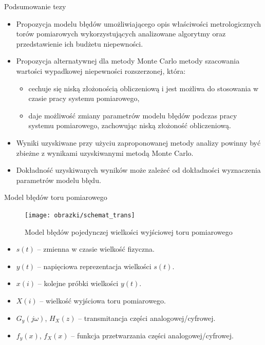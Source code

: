 \documentclass[12pt, polish, aspectratio = 169]{slides}
\begin{document}
\begin{frame}{Podsumowanie tezy}
\begin{itemize}
\item Propozycja modelu błędów umożliwiającego opis właściwości metrologicznych torów pomiarowych wykorzystujących analizowane algorytmy oraz przedstawienie ich budżetu niepewności.
\item Propozycja alternatywnej dla metody Monte Carlo metody szacowania wartości wypadkowej niepewności rozszerzonej, która:
	\begin{itemize}
	\item cechuje się niską złożonością obliczeniową i jest możliwa do stosowania w czasie pracy systemu pomiarowego,
	\item daje możliwość zmiany parametrów modelu błędów podczas pracy systemu pomiarowego, zachowując niską złożoność obliczeniową.
	\end{itemize}
\item Wyniki uzyskiwane przy użyciu zaproponowanej metody analizy powinny być zbieżne z wynikami uzyskiwanymi metodą Monte Carlo.
\item Dokładność uzyskiwanych wyników może zależeć od dokładności wyznaczenia parametrów modelu błędu.
\end{itemize}
\end{frame}


\begin{frame}{Model błędów toru pomiarowego}
\begin{figure}
\texttt{[image: obrazki/schemat\_trans]}
\caption{Model błędów pojedynczej wielkości wyjściowej toru pomiarowego}
\end{figure}
\begin{itemize}
\item $s(t)$ -- zmienna w czasie wielkość fizyczna.
\item $y(t)$ -- napięciowa reprezentacja wielkości $s(t)$.
\item $x(i)$ -- kolejne próbki wielkości $y(t)$.
\item $X(i)$ -- wielkość wyjściowa toru pomiarowego.
\item $G_{y}(j\omega)$, $H_{X}(z)$ -- transmitancja części analogowej/cyfrowej.
\item $f_{y}(x)$, $f_{X}(x)$ -- funkcja przetwarzania części analogowej/cyfrowej.
\end{itemize}
\end{frame}
\end{document}
